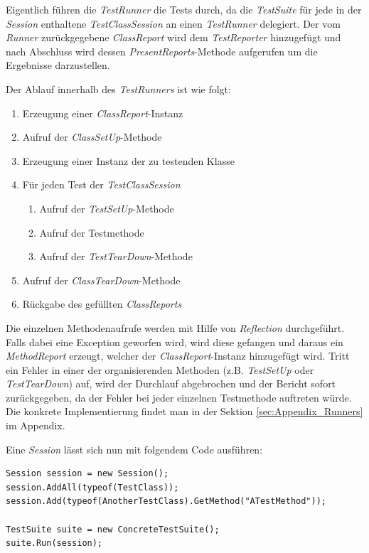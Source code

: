 Eigentlich führen die \textit{TestRunner} die Tests durch, da die \textit{TestSuite} für jede in der \textit{Session} enthaltene \textit{TestClassSession} an einen \textit{TestRunner} delegiert. Der vom \textit{Runner} zurückgegebene \textit{ClassReport} wird dem \textit{TestReporter} hinzugefügt und nach Abschluss wird dessen \textit{PresentReports}-Methode aufgerufen um die Ergebnisse darzustellen.

Der Ablauf innerhalb des \textit{TestRunners} ist wie folgt:
\begin{enumerate}
\item Erzeugung einer \textit{ClassReport}-Instanz
\item Aufruf der \textit{ClassSetUp}-Methode
\item Erzeugung einer Instanz der zu testenden Klasse
\item Für jeden Test der \textit{TestClassSession}
	\begin{enumerate}[label*=\arabic*.]
	\item Aufruf der \textit{TestSetUp}-Methode
	\item Aufruf der Testmethode
	\item Aufruf der \textit{TestTearDown}-Methode
	\end{enumerate}
\item Aufruf der \textit{ClassTearDown}-Methode
\item Rückgabe des gefüllten \textit{ClassReports}
\end{enumerate}

Die einzelnen Methodenaufrufe werden mit Hilfe von \textit{Reflection} durchgeführt. Falls dabei eine Exception geworfen wird, wird diese gefangen und daraus ein \textit{MethodReport} erzeugt, welcher der \textit{ClassReport}-Instanz hinzugefügt wird. Tritt ein Fehler in einer der organisierenden Methoden (z.B. \textit{TestSetUp} oder \textit{TestTearDown}) auf, wird der Durchlauf abgebrochen und der Bericht sofort zurückgegeben, da der Fehler bei jeder einzelnen Testmethode auftreten würde. Die konkrete Implementierung findet man in der Sektion \ref{sec:Appendix_Runners}  im Appendix.

Eine \textit{Session} lässt sich nun mit folgendem Code ausführen:
\begin{lstlisting}[caption={[Beispiel für die Ausführung einer \textit{Session}]Beispiel für die Ausführung einer \textit{Session}\\\textit{ConcreteTestSuite} ist stellvertretend für eine beliebige Implementierung von \textit{AbstractTestSuite}.}, label=code:Example_SessionCreation]
Session session = new Session();
session.AddAll(typeof(TestClass));
session.Add(typeof(AnotherTestClass).GetMethod("ATestMethod"));

TestSuite suite = new ConcreteTestSuite();
suite.Run(session);
\end{lstlisting}
\clearpage

